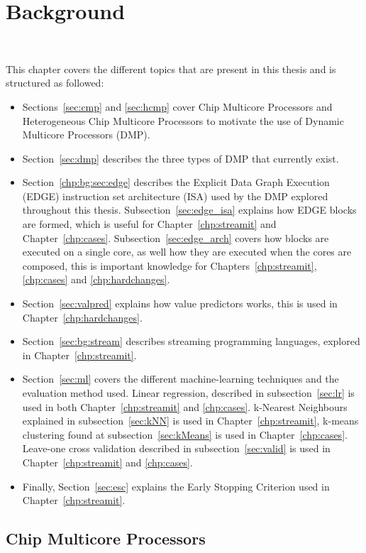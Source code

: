 \chapter{Background}~\label{chp:Background}

This chapter covers the different topics that are present in this thesis and is structured as followed:
\begin{itemize}
\item Sections~\ref{sec:cmp} and \ref{sec:hcmp} cover Chip Multicore Processors and Heterogeneous Chip Multicore Processors to motivate the use of Dynamic Multicore Processors (DMP).
\item Section~\ref{sec:dmp}  describes the three types of DMP that currently exist.
\item Section~\ref{chp:bg:sec:edge} describes the Explicit Data Graph Execution (EDGE) instruction set architecture (ISA) used by the DMP explored throughout this thesis.
Subsection~\ref{sec:edge_isa} explains how EDGE blocks are formed, which is useful for Chapter~\ref{chp:streamit} and Chapter~\ref{chp:cases}.
Subsection~\ref{sec:edge_arch} covers how blocks are executed on a single core, as well how they are executed when the cores are composed, this is important knowledge for Chapters~\ref{chp:streamit}, \ref{chp:cases} and \ref{chp:hardchanges}.
\item Section~\ref{sec:valpred} explains how value predictors works, this is used in Chapter~\ref{chp:hardchanges}.
\item Section~\ref{sec:bg:stream} describes streaming programming languages, explored in Chapter~\ref{chp:streamit}.
\item Section~\ref{sec:ml} covers the different machine-learning techniques and the evaluation method used.
Linear regression, described in subsection~\ref{sec:lr} is used in both Chapter~\ref{chp:streamit} and \ref{chp:cases}.
k-Nearest Neighbours explained in subsection~\ref{sec:kNN} is used in Chapter~\ref{chp:streamit}, k-means clustering found at subsection~\ref{sec:kMeans} is used in Chapter~\ref{chp:cases}.
Leave-one cross validation described in subsection~\ref{sec:valid} is used in Chapter~\ref{chp:streamit} and \ref{chp:cases}.
\item Finally, Section~\ref{sec:esc} explains the Early Stopping Criterion used in Chapter~\ref{chp:streamit}.
\end{itemize}

\section{Chip Multicore Processors}~\label{sec:cmp}

